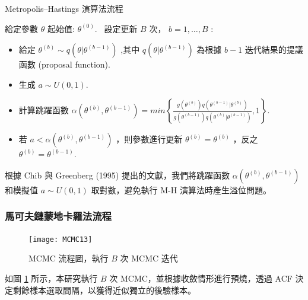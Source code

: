 \documentclass[12pt,a4paper]{article}
\begin{document}
\begin{CJK}{UTF8}{bkai}
\begin{algorithm}[H]
	\caption{Metropolis--Hastings 演算法流程}
	\label{alg:2}
	\begin{algorithmic}[1]
	\STATE 給定參數  $\theta$ 起始值: $\theta^{(0)}$. \
	\STATE 設定更新 $B$ 次， $b =1,\dots,B$ :
	\begin{itemize}
	\item 給定 $\theta^{(b)} \sim q \left(\theta|\theta^{(b-1)}\right)$ ,其中 $q \left(\theta|\theta^{(b-1)}\right)$ 為根據 $b-1$ 迭代結果的提議函數 (proposal function).
    \item 生成 $a \sim U(0,1)$.
	\item 計算跳躍函數 $\alpha\left(\theta^{(b)},\theta^{(b-1)}\right) = min \left\{ \frac{g(\theta^{(b)})q(\theta^{(b-1)}|\theta^{(b)})}{g(\theta^{(b-1)})q(\theta^{(b)}|\theta^{(b-1)})},1 \right\}$.
	\item 若 $a < \alpha\left(\theta^{(b)},\theta^{(b-1)}\right)$ ，則參數進行更新 $\theta^{(b)} = \theta^{(b)}$ ，反之 $\theta^{(b)} = \theta^{(b-1)}$.
    \end{itemize}
	\end{algorithmic}
\end{algorithm}
\noindent
\setlength\abovedisplayskip{25pt}
\setlength\belowdisplayskip{25pt}
\noindent 根據 Chib 與 Greenberg (1995) 提出的文獻，我們將跳躍函數 $\alpha\left(\theta^{(b)},\theta^{(b-1)}\right)$ 和模擬值 $a \sim U(0,1)$ 取對數，避免執行 M-H 演算法時產生溢位問題。



\subsubsection{馬可夫鏈蒙地卡羅法流程}\label{sec:2.2.3}
\begin{figure}[H]
\centering %
\texttt{[image: MCMC13]} %
\caption{MCMC 流程圖，執行 $B$ 次 MCMC 迭代} %
\label{Fig.main1} %
\end{figure}
如圖 \ref{Fig.main1} 所示，本研究執行 $B$ 次 MCMC，並根據收斂情形進行預燒，透過 ACF 決定剩餘樣本選取間隔，以獲得近似獨立的後驗樣本。

\newpage


\end{CJK}
\end{document}
